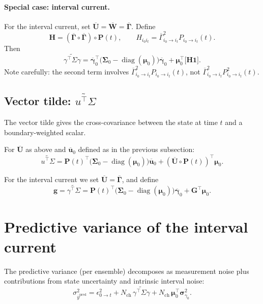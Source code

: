 \documentclass[11pt]{article}
\begin{document}
\paragraph{Special case: interval current.}

For the interval current, set \(\overline{\mathbf{U}}=\overline{\mathbf{W}}=\overline{\mathbf{\Gamma}}\). Define
\[
  \mathbf{H}
  =
  (\overline{\mathbf{\Gamma}}\circ\overline{\mathbf{\Gamma}})\circ\mathbf{P}(t),
  \qquad
  H_{i_0 i_t}
  =
  \overline{\Gamma}_{i_0\to i_t}^2 P_{i_0\to i_t}(t).
\]
Then
\[
  \boxed{
    \widetilde{\gamma^\top\Sigma\gamma}
    =
    \overline{\boldsymbol{\gamma}}_0^\top
    \bigl(\boldsymbol{\Sigma}_0-\operatorname{diag}(\boldsymbol{\mu}_0)\bigr)
    \overline{\boldsymbol{\gamma}}_0
    +
    \boldsymbol{\mu}_0^\top
    \bigl[\mathbf{H}\mathbf{1}\bigr]
  }.
\]
Note carefully: the second term involves \(\overline{\Gamma}_{i_0\to i_t}^2 P_{i_0\to i_t}(t)\), not \(\overline{\Gamma}_{i_0\to i_t}^2 P_{i_0\to i_t}^2(t)\).

\subsection{Vector tilde: \texorpdfstring{\(\widetilde{u^\top\Sigma}\)}{uTSigma-tilde}}

The vector tilde gives the cross-covariance between the state at time \(t\) and a boundary-weighted scalar.

For \(\overline{\mathbf{U}}\) as above and \(\overline{\boldsymbol{u}}_0\) defined as in the previous subsection:
\[
  \boxed{
    \widetilde{u^\top\Sigma}
    =
    \mathbf{P}(t)^\top
    \bigl(\boldsymbol{\Sigma}_0-\operatorname{diag}(\boldsymbol{\mu}_0)\bigr)
    \overline{\boldsymbol{u}}_0
    +
    (\overline{\mathbf{U}}\circ\mathbf{P}(t))^\top \boldsymbol{\mu}_0
  }.
\]

For the interval current we set \(\overline{\mathbf{U}}=\overline{\mathbf{\Gamma}}\), and define
\[
  \boxed{
    \mathbf{g}
    =
    \widetilde{\gamma^\top\Sigma}
    =
    \mathbf{P}(t)^\top
    \bigl(\boldsymbol{\Sigma}_0-\operatorname{diag}(\boldsymbol{\mu}_0)\bigr)
    \overline{\boldsymbol{\gamma}}_0
    +
    \mathbf{G}^\top\boldsymbol{\mu}_0
  }.
\]

\section{Predictive variance of the interval current}

The predictive variance (per ensemble) decomposes as measurement noise plus contributions from state uncertainty and intrinsic interval noise:
\[
  \boxed{
    \sigma^2_{\overline{y}^{\text{pred}}}
    =
    \epsilon^2_{0\to t}
    +
    N_{\text{ch}}\,
    \widetilde{\gamma^\top\Sigma\gamma}
    +
    N_{\text{ch}}\,
    \boldsymbol{\mu}_0^\top\boldsymbol{\sigma}^2_{\overline{\gamma}_0}
  }.
\]
\end{document}
